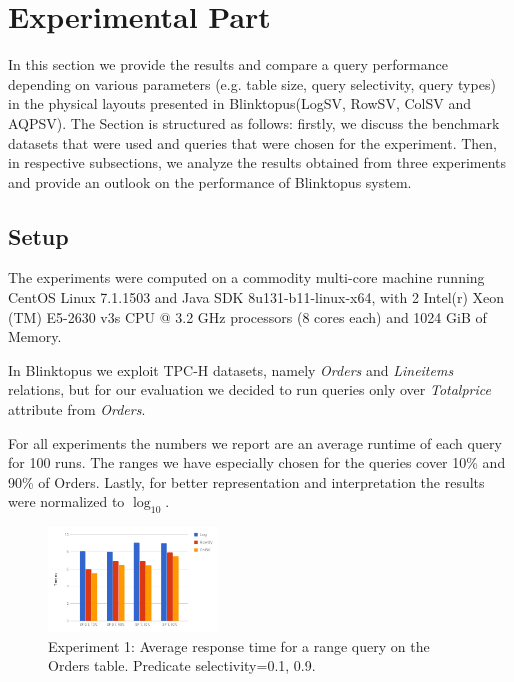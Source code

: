 \documentclass[10pt, conference, compsocconf]{IEEEtran}
\begin{document}
\section{Experimental Part}
In this section we provide the results and compare a query performance depending on various parameters (e.g. table size, query selectivity, query types) in the physical layouts presented in Blinktopus(LogSV, RowSV, ColSV and AQPSV). The Section is structured as follows: firstly, we discuss the benchmark datasets that were used and queries that were chosen for the experiment. Then, in respective subsections, we analyze the results obtained from three experiments and provide an outlook on the performance of Blinktopus system.

\label{subsec:Setup}
\subsection{Setup}

The experiments were computed on a commodity multi-core machine running CentOS Linux 7.1.1503 and Java SDK 8u131-b11-linux-x64, with 2 Intel(r) Xeon (TM) E5-2630 v3s CPU @ 3.2 GHz processors (8 cores each) and 1024 GiB of Memory. 

In Blinktopus we exploit TPC-H datasets, namely \textit{Orders} and \textit{Lineitems} relations, but for our evaluation we decided to run queries only over \textit{Totalprice} attribute from \textit{Orders}.

For all experiments the numbers we report are an average runtime of each query for 100 runs. The ranges we have especially chosen for the queries cover 10\% and 90\% of Orders. Lastly, for better representation and interpretation the results were normalized to $\log_{10}$.

\label{fig:exp1}
\begin{figure} \includegraphics[width=0.4\textwidth, center]{img/exp1.png} 
\caption{Experiment 1: Average response time for a range query on the Orders table. Predicate selectivity=0.1, 0.9.}
\end{figure}
\end{document}
